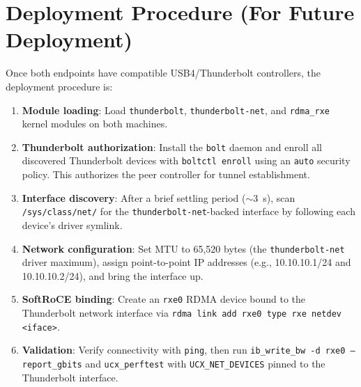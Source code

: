 \documentclass[11pt,letterpaper]{article}
\begin{document}
\section{Deployment Procedure (For Future Deployment)}
\label{sec:usb4-setup}

Once both endpoints have compatible USB4/Thunderbolt controllers, the deployment procedure is:

\begin{enumerate}
    \item \textbf{Module loading}: Load \texttt{thunderbolt}, \texttt{thunderbolt-net}, and \texttt{rdma\_rxe} kernel modules on both machines.

    \item \textbf{Thunderbolt authorization}: Install the \texttt{bolt} daemon and enroll all discovered Thunderbolt devices with \texttt{boltctl enroll} using an \texttt{auto} security policy. This authorizes the peer controller for tunnel establishment.

    \item \textbf{Interface discovery}: After a brief settling period (${\sim}3$~s), scan \texttt{/sys/class/net/} for the \texttt{thunderbolt-net}-backed interface by following each device's driver symlink.

    \item \textbf{Network configuration}: Set MTU to 65,520 bytes (the \texttt{thunderbolt-net} driver maximum), assign point-to-point IP addresses (e.g., 10.10.10.1/24 and 10.10.10.2/24), and bring the interface up.

    \item \textbf{SoftRoCE binding}: Create an \texttt{rxe0} RDMA device bound to the Thunderbolt network interface via \texttt{rdma link add rxe0 type rxe netdev <iface>}.

    \item \textbf{Validation}: Verify connectivity with \texttt{ping}, then run \texttt{ib\_write\_bw -d rxe0 --report\_gbits} and \texttt{ucx\_perftest} with \texttt{UCX\_NET\_DEVICES} pinned to the Thunderbolt interface.
\end{enumerate}

\end{document}
